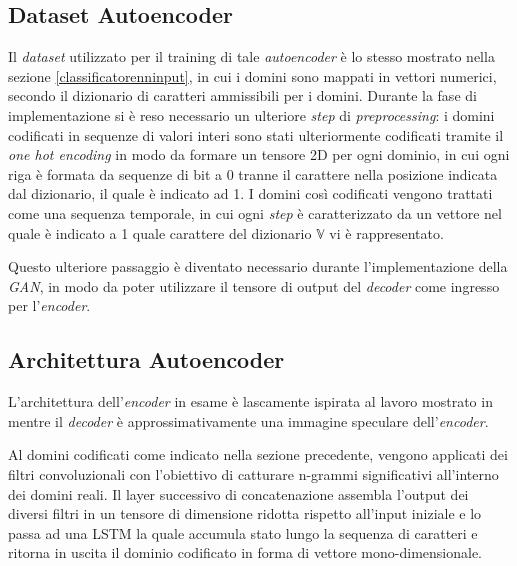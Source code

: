 \subsection{Dataset Autoencoder}
\label{datasetautoencoder}
Il \textit{dataset} utilizzato per il training di tale \textit{autoencoder} è lo stesso mostrato nella sezione \ref{classificatorenninput}, in cui i domini sono mappati in vettori numerici, secondo il dizionario di caratteri ammissibili per i domini. Durante la fase di implementazione si è reso necessario un ulteriore \textit{step} di \textit{preprocessing}: i domini codificati in sequenze di valori interi sono stati ulteriormente codificati tramite il \textit{one hot encoding} \cite{onehot} in modo da formare un tensore 2D per ogni dominio, in cui ogni riga è formata da sequenze di bit a 0 tranne il carattere nella posizione indicata dal dizionario, il quale è indicato ad 1. I domini così codificati vengono trattati come una sequenza temporale, in cui ogni \textit{step} è caratterizzato da un vettore nel quale è indicato a 1 quale carattere del dizionario $\mathbb{V}$ vi è rappresentato. 


Questo ulteriore passaggio è diventato necessario durante l'implementazione della \textit{GAN}, in modo da poter utilizzare il tensore di output del \textit{decoder} come ingresso per l'\textit{encoder}.


\subsection{Architettura Autoencoder}
\label{archautoencoder}
L'architettura dell'\textit{encoder} in esame è lascamente ispirata al lavoro mostrato in \cite{1508.06615} mentre il \textit{decoder} è approssimativamente una immagine speculare dell'\textit{encoder}.

Al domini codificati come indicato nella sezione precedente, vengono applicati dei filtri convoluzionali con l'obiettivo di catturare n-grammi significativi all'interno dei domini reali. Il layer successivo di concatenazione assembla l'output dei diversi filtri in un tensore di dimensione ridotta rispetto all'input iniziale e lo passa ad una LSTM la quale accumula stato lungo la sequenza di caratteri e ritorna in uscita il dominio codificato in forma di vettore mono-dimensionale.

